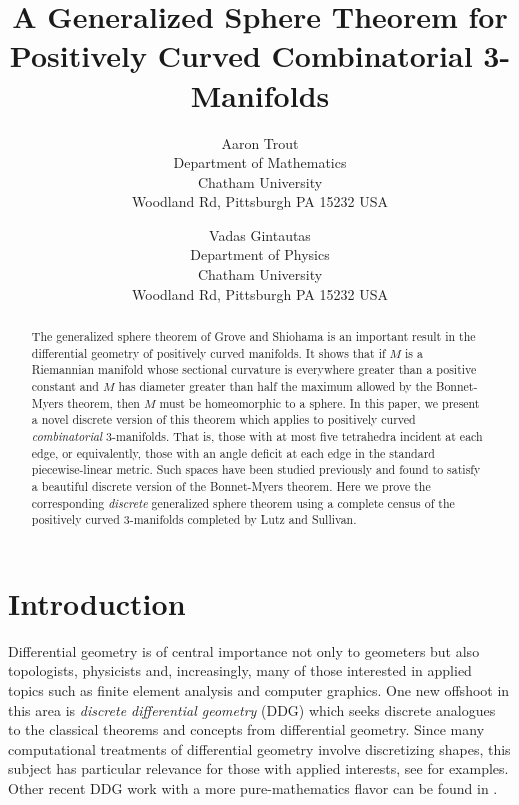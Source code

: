 \documentclass[12pt]{article}
\begin{document}
\nocite{*}

\title{A Generalized Sphere Theorem for Positively Curved Combinatorial 3-Manifolds}

\author{Aaron Trout \\ Department of Mathematics \\
Chatham University \\ Woodland Rd, Pittsburgh PA 15232 USA \and
Vadas Gintautas\\ Department of Physics \\
Chatham University \\ Woodland Rd, Pittsburgh PA 15232 USA}


\maketitle

\begin{abstract}
The generalized sphere theorem of Grove and Shiohama is an important result in the differential geometry of positively curved manifolds. It shows that if $M$ is a Riemannian manifold whose sectional curvature is everywhere greater than a positive constant and $M$ has diameter greater than half the maximum allowed by the Bonnet-Myers theorem, then $M$ must be homeomorphic to a sphere. In this paper, we present a novel discrete version of this theorem which applies to positively curved {\em combinatorial} 3-manifolds. That is, those with at most five tetrahedra incident at each edge, or equivalently, those with an angle deficit at each edge in the standard piecewise-linear metric. Such spaces have been studied previously and found to satisfy a beautiful discrete version of the Bonnet-Myers theorem. Here we prove the corresponding {\em discrete} generalized sphere theorem using a complete census of the positively curved 3-manifolds completed by Lutz and Sullivan.
\end{abstract}


\section{Introduction}

Differential geometry is of central importance not only to geometers but also topologists, physicists and, increasingly, many of those interested in applied topics such as finite element analysis and computer graphics. One new offshoot in this area is {\em discrete differential geometry} (DDG) which seeks discrete analogues to the classical theorems and concepts from differential geometry. Since many computational treatments of differential geometry involve discretizing shapes, this subject has particular relevance for those with applied interests, see \cite{grinspun2006discrete} for examples. Other recent DDG work with a more pure-mathematics flavor can be found in \cite{BMM,Crowley,EMM,forman2,GGL1,GGL2,GGL3,stone}. 
\end{document}
